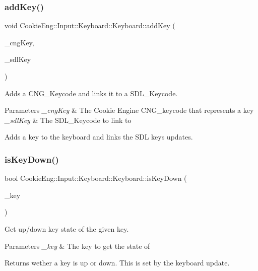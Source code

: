 \subsubsection{\texorpdfstring{add\+Key()}{addKey()}}
{\footnotesize\ttfamily void Cookie\+Eng\+::\+Input\+::\+Keyboard\+::\+Keyboard\+::add\+Key (\begin{DoxyParamCaption}\item[{C\+N\+G\+\_\+\+Keycode}]{\+\_\+cng\+Key,  }\item[{S\+D\+L\+\_\+\+Keycode}]{\+\_\+sdl\+Key }\end{DoxyParamCaption})}



Adds a C\+N\+G\+\_\+\+Keycode and links it to a S\+D\+L\+\_\+\+Keycode. 


\begin{DoxyParams}{Parameters}
{\em \+\_\+cng\+Key} & The Cookie Engine C\+N\+G\+\_\+keycode that represents a key \\
\hline
{\em \+\_\+sdl\+Key} & The S\+D\+L\+\_\+\+Keycode to link to\\
\hline
\end{DoxyParams}
Adds a key to the keyboard and links the S\+DL keys updates. \mbox{\label{class_cookie_eng_1_1_input_1_1_keyboard_1_1_keyboard_aa5a05911bc70b35341e2d6ff7db7ce6c}} 
\subsubsection{\texorpdfstring{is\+Key\+Down()}{isKeyDown()}}
{\footnotesize\ttfamily bool Cookie\+Eng\+::\+Input\+::\+Keyboard\+::\+Keyboard\+::is\+Key\+Down (\begin{DoxyParamCaption}\item[{C\+N\+G\+\_\+\+Keycode}]{\+\_\+key }\end{DoxyParamCaption})\hspace{0.3cm}{\ttfamily [inline]}}



Get up/down key state of the given key. 


\begin{DoxyParams}{Parameters}
{\em \+\_\+key} & The key to get the state of\\
\hline
\end{DoxyParams}
Returns wether a key is up or down. This is set by the keyboard update. \mbox{\label{class_cookie_eng_1_1_input_1_1_keyboard_1_1_keyboard_a2e38885012c428de44e6bca881bb305d}} 
